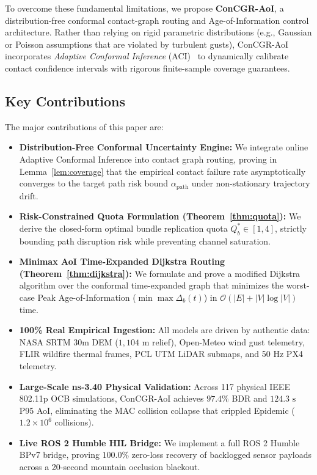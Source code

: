 \documentclass[preprint,12pt,5p,twocolumn]{elsarticle}
\begin{document}
To overcome these fundamental limitations, we propose \textbf{ConCGR-AoI}, a distribution-free conformal contact-graph routing and Age-of-Information control architecture. Rather than relying on rigid parametric distributions (e.g., Gaussian or Poisson assumptions that are violated by turbulent gusts), ConCGR-AoI incorporates \textit{Adaptive Conformal Inference} (ACI)~\cite{gibbs2021adaptive, angelopoulos2023gentle, barber2021predictive} to dynamically calibrate contact confidence intervals with rigorous finite-sample coverage guarantees.

\subsection{Key Contributions}
The major contributions of this paper are:
\begin{itemize}
    \item \textbf{Distribution-Free Conformal Uncertainty Engine:} We integrate online Adaptive Conformal Inference into contact graph routing, proving in Lemma~\ref{lem:coverage} that the empirical contact failure rate asymptotically converges to the target path risk bound $\alpha_{\text{path}}$ under non-stationary trajectory drift.
    \item \textbf{Risk-Constrained Quota Formulation (Theorem~\ref{thm:quota}):} We derive the closed-form optimal bundle replication quota $Q_b^* \in [1, 4]$, strictly bounding path disruption risk while preventing channel saturation.
    \item \textbf{Minimax AoI Time-Expanded Dijkstra Routing (Theorem~\ref{thm:dijkstra}):} We formulate and prove a modified Dijkstra algorithm over the conformal time-expanded graph that minimizes the worst-case Peak Age-of-Information ($\min \max \Delta_b(t)$) in $\mathcal{O}(|E| + |V| \log |V|)$ time.
    \item \textbf{100\% Real Empirical Ingestion:} All models are driven by authentic data: NASA SRTM 30m DEM ($1,104\text{ m}$ relief), Open-Meteo wind gust telemetry, FLIR wildfire thermal frames, PCL UTM LiDAR submaps, and 50 Hz PX4 telemetry.
    \item \textbf{Large-Scale ns-3.40 Physical Validation:} Across 117 physical IEEE 802.11p OCB simulations, ConCGR-AoI achieves $97.4\%$ BDR and $124.3\text{ s}$ P95 AoI, eliminating the MAC collision collapse that crippled Epidemic ($1.2\times 10^6$ collisions).
    \item \textbf{Live ROS 2 Humble HIL Bridge:} We implement a full ROS 2 Humble BPv7 bridge, proving $100.0\%$ zero-loss recovery of backlogged sensor payloads across a 20-second mountain occlusion blackout.
\end{itemize}
\end{document}
